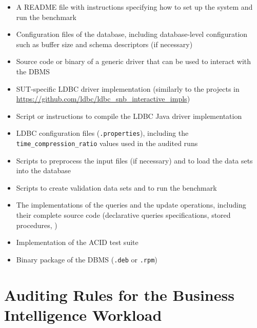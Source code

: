 \begin{itemize}
    \item A README file with instructions specifying how to set up the system and run the benchmark
    \item Configuration files of the database, including database-level configuration such as buffer size and schema descriptors (if necessary)
    \item Source code or binary of a generic driver that can be used to interact with the DBMS
    \item SUT-specific LDBC driver implementation (similarly to the projects in \url{https://github.com/ldbc/ldbc_snb_interactive_impls})
    \item Script or instructions to compile the LDBC Java driver implementation
    \item LDBC configuration files (\texttt{.properties}), including the \texttt{time\_compression\_ratio} values used in the audited runs
    \item Scripts to preprocess the input files (if necessary) and to load the data sets into the database
    \item Scripts to create validation data sets and to run the benchmark
    \item The implementations of the queries and the update operations, including their complete source code (\eg declarative queries specifications, stored procedures, \etc)
    \item Implementation of the ACID test suite
    \item Binary package of the DBMS (\eg \texttt{.deb} or \texttt{.rpm})
\end{itemize}




\section{Auditing Rules for the Business Intelligence Workload}
\label{sec:bi-workload-audit}


